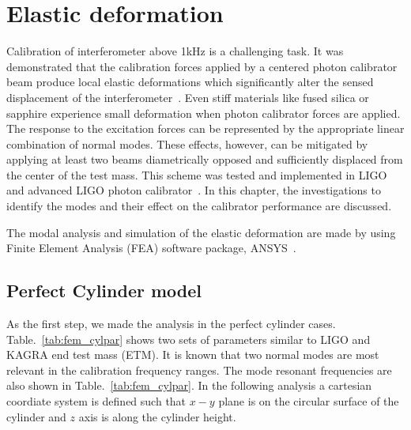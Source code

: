 

\chapter{Elastic deformation} %

\label{Chapter4} %
Calibration of interferometer above 1kHz is a challenging task. 
It was demonstrated that the calibration forces applied by a centered 
photon calibrator beam produce local elastic deformations which 
significantly alter the sensed displacement of the 
interferometer~\cite{Hild:2007,Goetz:2009}.
Even stiff materials like fused silica or sapphire experience small 
deformation when photon calibrator forces are applied. The response to 
the excitation forces can be represented by the appropriate linear 
combination of normal modes. These effects, however, can be mitigated 
by applying at least two beams diametrically opposed and sufficiently 
displaced from the center of the test mass. 
This scheme was tested and implemented in LIGO and advanced LIGO photon 
calibrator~\cite{Daveloza,Karki}.
In this chapter, the investigations to identify 
the modes and their effect on the calibrator performance are discussed.  

The modal analysis and simulation of the elastic deformation are made 
by using Finite Element Analysis (FEA) software package, ANSYS~\cite{ANSYS}. 


\section{Perfect Cylinder model}

As the first step, we made the analysis in the perfect cylinder cases.
Table.~\ref{tab:fem_cylpar} shows two sets of parameters similar to LIGO 
and KAGRA end test mass (ETM). 
It is known that two normal modes are most relevant in the calibration 
frequency ranges. The mode resonant frequencies are also shown 
in Table.~\ref{tab:fem_cylpar}.
In the following analysis a cartesian coordiate system is defined 
such that $x-y$ plane is on the circular surface of the cylinder 
and $z$ axis is along the cylinder height.

